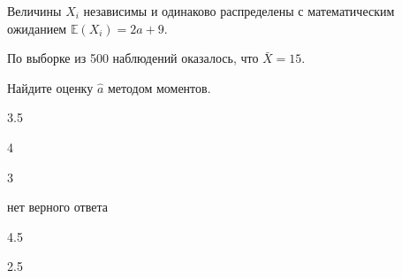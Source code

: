 
\begin{question}
Величины \(X_i\) независимы и одинаково распределены с математическим
ожиданием \(\mathbb{E}(X_i) = 2 a + 9\).

По выборке из 500 наблюдений оказалось, что \(\bar X = 15\).

Найдите оценку \(\hat a\) методом моментов.
\begin{answerlist}
  \item 3.5
  \item 4
  \item 3
  \item нет верного ответа
  \item 4.5
  \item 2.5
\end{answerlist}
\end{question}


